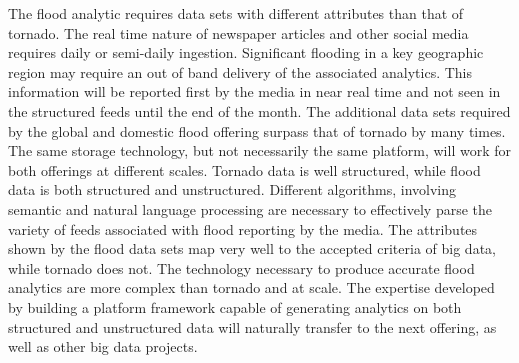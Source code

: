 The flood analytic requires data sets with different attributes than that of tornado. The real time nature of newspaper articles and other social media requires daily or semi-daily ingestion. Significant flooding in a key geographic region may require an out of band delivery of the associated analytics.  This information will be reported first by the media in near real time and not seen in the structured feeds until the end of the month. The additional data sets required by the global and domestic flood offering surpass that of tornado by many times. The same storage technology, but not necessarily the same platform, will work for both offerings at different scales. Tornado data is well structured, while flood data is both structured and unstructured. Different algorithms, involving semantic and natural language processing are necessary to effectively parse the variety of feeds associated with flood reporting by the media.  The attributes shown by the flood  data sets map very well to the accepted criteria of big data, while tornado does not. The technology necessary to produce accurate flood analytics are more complex than tornado and at scale.  The expertise developed by building a platform framework capable of generating analytics on both structured and unstructured data will naturally transfer to the next \climatedge offering, as well as other big data projects.